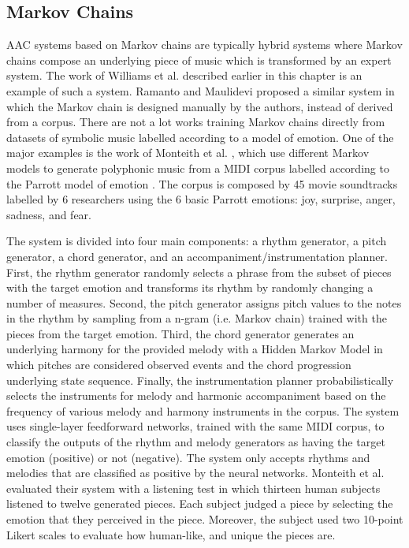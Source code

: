 \subsection{Markov Chains}

AAC systems based on Markov chains are typically hybrid systems where Markov chains compose an underlying piece of music which is transformed by an expert system. The work of Williams et al. \cite{williams2015dynamic} described earlier in this chapter is an example of such a system. Ramanto and Maulidevi \cite{ramanto2017markov} proposed a similar system in which the Markov chain is designed manually by the authors, instead of derived from a corpus. There are not a lot works training Markov chains directly from datasets of symbolic music labelled according to a model of emotion. One of the major examples is the work of Monteith et al. \cite{monteith2010automatic, chan2008automatic}, which use different Markov models to generate polyphonic music from a MIDI corpus labelled according to the Parrott model of emotion \cite{parrott2001emotions}. The corpus is composed by 45 movie soundtracks labelled by 6 researchers using the 6 basic Parrott emotions: joy, surprise, anger, sadness, and fear.

The system is divided into four main components: a rhythm generator, a pitch generator, a chord generator, and an accompaniment/instrumentation planner. First, the rhythm generator randomly selects a phrase from the subset of pieces with the target emotion and transforms its rhythm by randomly changing a number of measures. Second, the pitch generator assigns pitch values to the notes in the rhythm by sampling from a n-gram (i.e. Markov chain) trained with the pieces from the target emotion. Third, the chord generator generates an underlying harmony for the provided melody with a Hidden Markov Model in which pitches are considered observed events and the chord progression underlying state sequence. Finally, the instrumentation planner probabilistically selects the instruments for melody and harmonic accompaniment based on the frequency of various melody and harmony instruments in the corpus. The system uses single-layer feedforward networks, trained with the same MIDI corpus, to classify the outputs of the rhythm and melody generators as having the target emotion (positive) or not (negative). The system only accepts rhythms and melodies that are classified as positive by the neural networks. Monteith et al. \cite{monteith2010automatic} evaluated their system with a listening test in which thirteen human subjects listened to twelve generated pieces. Each subject judged a piece by selecting the emotion that they perceived in the piece. Moreover, the subject used two 10-point Likert scales to evaluate how human-like, and unique the pieces are.

